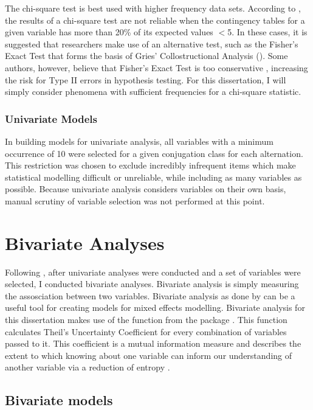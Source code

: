 The chi-square test is best used with higher frequency data sets. According to \citet{cochran1954some}, the results of a chi-square test are not reliable when the contingency tables for a given variable has more than 20\% of its expected values $<$5. In these cases, it is suggested that researchers make use of an alternative test, such as the Fisher's Exact Test that forms the basis of Gries' Collostructional Analysis (\citeyear{gries2004extending}). Some authors, however, believe that Fisher's Exact Test is too conservative \citep{dagostino}, increasing the risk for Type II errors in hypothesis testing. For this dissertation, I will simply consider phenomena with sufficient frequencies for a chi-square statistic.



\subsubsection{Univariate Models}
In building models for univariate analysis, all variables with a minimum occurrence of 10 were selected for a given conjugation class for each alternation. This restriction was chosen to exclude incredibly infrequent items which make statistical modelling difficult or unreliable, while including as many variables as possible. Because univariate analysis considers variables on their own basis, manual scrutiny of variable selection was not performed at this point. 

\section{Bivariate Analyses}
Following \citet{arppe2008univariate}, after univariate analyses were conducted and a set of variables were selected, I conducted bivariate analyses. Bivariate analysis is simply measuring the assosciation between two variables. Bivariate analysis as done by \citet{arppe2008univariate} can be a useful tool for creating models for mixed effects modelling. Bivariate analysis for this dissertation makes use of the  function from the  package \citep{polytomous}. This function calculates Theil's Uncertainty Coefficient \citep{theil} for every combination of variables passed to it. This coefficient is a mutual information measure and describes the extent to which knowing about one variable can inform our understanding of another variable via a reduction of entropy \citep[90]{arppe2008univariate}. 


\subsection{Bivariate models}

